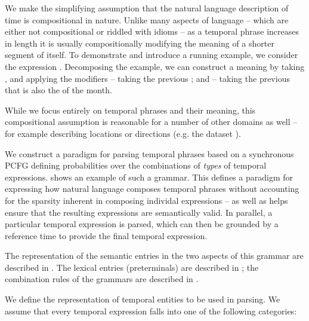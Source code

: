 
We make the simplifying assumption that the natural language description
	of time is compositional in nature.
Unlike many aspects of language  -- which are either not compositional or
	riddled with idioms -- as a temporal phrase increases in length it is
	usually compositionally modifying the meaning of a shorter segment of itself.
To demonstrate and introduce a running example, we consider the expression
	.
Decomposing the example, we can construct a meaning by taking ,
	and applying the modifiers  -- taking the previous ;
	and  -- taking the previous  that is
	also the  of the month.

While we focus entirely on temporal phrases and their meaning, this
	compositional assumption is reasonable for a number of other domains as 
	well -- for example describing locations or directions (e.g. the 
	 dataset \needcite).

We construct a paradigm for parsing temporal phrases based on a synchronous
	PCFG defining probabilities over the combinations of \textit{types}
	of temporal expressions.
\needfig shows an example of such a grammar.
This defines a paradigm for expressing how natural language composes
	temporal phrases without accounting for the sparsity inherent in composing
	individal expressions -- as well as helps ensure that the resulting
	expressions are semantically valid.
In parallel, a particular temporal expression is parsed, which can then
	be grounded by a reference time to provide the final temporal expression.

The representation of the semantic entries in the two aspects of this grammar
	are described in .
The lexical entries (preterminals) are described in ;
	the combination rules of the grammars are described in .

We define the representation of temporal entities to be used in parsing.
We assume that every temporal expression falls into one of the following
	categories:
